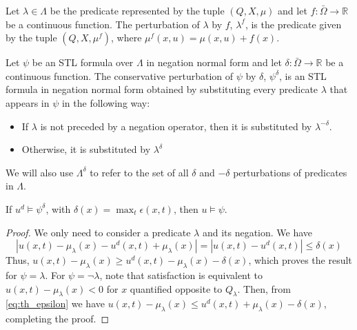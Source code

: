 \documentclass[oribibl]{llncs/llncs}
\newcommand*{\R}{\mathbb{R}}
\begin{document}
\begin{definition}
\label{def:m_perturbation}
    Let $\lambda \in \Lambda$ be the predicate represented by the tuple $(Q, X,
    \mu)$ and let $f : \bar\Omega \to \R$ be a continuous function. The perturbation of
    $\lambda$ by $f$, $\lambda^f$, is the predicate given by the tuple $(Q, X,
    \mu^f)$, where $\mu^f(x, u) = \mu(x, u) + f(x)$.
\end{definition}

\begin{definition}
\label{def:delta_perturbation}
    Let $\psi$ be an STL formula over $\Lambda$ in negation normal form 
    and let $\delta : \bar\Omega \to \R$ be a continuous function. The
    conservative perturbation of $\psi$ by $\delta$, $\psi^\delta$, is an STL
    formula in negation normal form obtained by substituting every predicate
    $\lambda$ that appears in $\psi$ in the following way:

    \begin{itemize}
        \item If $\lambda$ is not preceded by a negation operator, then it is
            substituted by $\lambda^{-\delta}$.
        \item Otherwise, it is substituted by $\lambda^{\delta}$
    \end{itemize}

    We will also use $\Lambda^{\delta}$ to refer to the set of all $\delta$ and
    $-\delta$
    perturbations of predicates in $\Lambda$.
\end{definition}

\begin{theorem}
\label{th:epsilon_approximation}
    If $u^d \models \psi^{\delta}$, with $\delta(x) = \max_t \epsilon(x, t)$, then $u \models \psi$.
\end{theorem}
\begin{proof}
    We only need to consider a predicate $\lambda$ and its negation. We have
    \begin{equation}
        \label{eq:th_epsilon}
         |u(x, t) - \mu_\lambda(x) - u^d(x, t) + \mu_\lambda(x)| = 
         |u(x, t) - u^d(x, t)| \leq \delta(x)
    \end{equation}
    Thus, $u(x, t) - \mu_\lambda(x) \geq u^d(x, t) -
    \mu_\lambda(x) - \delta(x)$, which proves the result for $\psi = \lambda$. For $\psi
    = \lnot \lambda$, note that satisfaction is equivalent to $u(x, t) -
    \mu_\lambda(x) < 0$ for $x$ quantified opposite to $Q_\lambda$. Then, from
    \cref{eq:th_epsilon} we have $u(x, t) - \mu_\lambda(x) \leq u^d(x, t) +
    \mu_\lambda(x) - \delta(x)$, completing the proof.
\end{proof}
\end{document}
